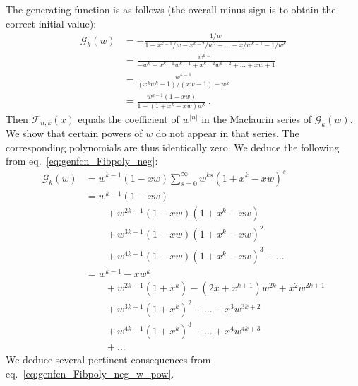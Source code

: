 \documentclass[review]{elsarticle}
\theoremstyle{plain}
\begin{document}
The generating function is as follows (the overall minus sign is to obtain the correct initial value):
\begin{equation}  
\label{eq:genfcn_Fibpoly_neg}
\begin{split}  
  \mathcal{G}_k(w) &= -\frac{1/w}{1 -x^{k-1}/w -x^{k-2}/w^2 -\dots -x/w^{k-1} -1/w^k}
  \\
  &= \frac{w^{k-1}}{-w^k +x^{k-1}w^{k-1} +x^{k-2}w^{k-2} +\dots +xw +1}
  \\
  &= \frac{w^{k-1}}{(x^kw^k-1)/(xw-1)-w^k}
  \\
  &= \frac{w^{k-1}(1-xw)}{1 -(1+x^k -xw)w^k} \,.
\end{split}  
\end{equation}
Then $\mathcal{F}_{n,k}(x)$ equals the coefficient of $w^{|n|}$ in the Maclaurin series of $\mathcal{G}_k(w)$.
We show that certain powers of $w$ do not appear in that series.
The corresponding polynomials are thus identically zero.
We deduce the following from eq.~\eqref{eq:genfcn_Fibpoly_neg}:
\begin{equation}  
\label{eq:genfcn_Fibpoly_neg_w_pow}
\begin{split}  
  \mathcal{G}_k(w) &= w^{k-1}(1-xw)\sum_{s=0}^\infty w^{ks}(1+x^k -xw)^s
  \\
  &= w^{k-1}(1-xw)
  \\
  &\qquad +w^{2k-1}(1-xw)(1+x^k -xw)
  \\
  &\qquad +w^{3k-1}(1-xw)(1+x^k -xw)^2 
  \\
  &\qquad +w^{4k-1}(1-xw)(1+x^k -xw)^3 +\dots
  \\
  &= w^{k-1} -xw^k
  \\
  &\qquad +w^{2k-1}(1+x^k) -(2x+x^{k+1})w^{2k} +x^2w^{2k+1}
  \\
  &\qquad +w^{3k-1}(1+x^k)^2 +\dots -x^3w^{3k+2}
  \\
  &\qquad +w^{4k-1}(1+x^k)^3 +\dots +x^4w^{4k+3}
  \\
  &\qquad +\dots
\end{split}  
\end{equation}
We deduce several pertinent consequences from eq.~\eqref{eq:genfcn_Fibpoly_neg_w_pow}.
\end{document}
